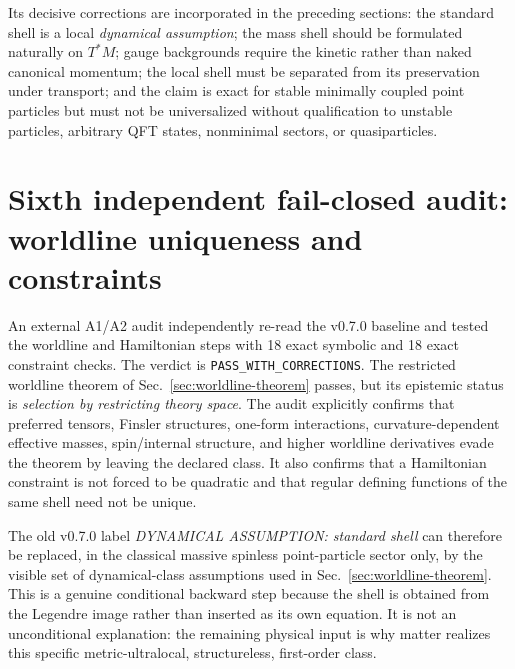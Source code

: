 \documentclass[11pt,a4paper]{article}
\begin{document}
Its decisive corrections are incorporated in the preceding sections: the standard shell is a local \emph{dynamical assumption}; the mass shell should be formulated naturally on $T^*M$; gauge backgrounds require the kinetic rather than naked canonical momentum; the local shell must be separated from its preservation under transport; and the claim is exact for stable minimally coupled point particles but must not be universalized without qualification to unstable particles, arbitrary QFT states, nonminimal sectors, or quasiparticles.


\section{Sixth independent fail-closed audit: worldline uniqueness and constraints}
An external A1/A2 audit independently re-read the v0.7.0 baseline and tested the worldline and Hamiltonian steps with 18 exact symbolic and 18 exact constraint checks.  The verdict is \texttt{PASS\_WITH\_CORRECTIONS}.  The restricted worldline theorem of Sec.~\ref{sec:worldline-theorem} passes, but its epistemic status is \emph{selection by restricting theory space}.  The audit explicitly confirms that preferred tensors, Finsler structures, one-form interactions, curvature-dependent effective masses, spin/internal structure, and higher worldline derivatives evade the theorem by leaving the declared class.  It also confirms that a Hamiltonian constraint is not forced to be quadratic and that regular defining functions of the same shell need not be unique.

The old v0.7.0 label \emph{DYNAMICAL ASSUMPTION: standard shell} can therefore be replaced, in the classical massive spinless point-particle sector only, by the visible set of dynamical-class assumptions used in Sec.~\ref{sec:worldline-theorem}.  This is a genuine conditional backward step because the shell is obtained from the Legendre image rather than inserted as its own equation.  It is not an unconditional explanation: the remaining physical input is why matter realizes this specific metric-ultralocal, structureless, first-order class.
\end{document}
